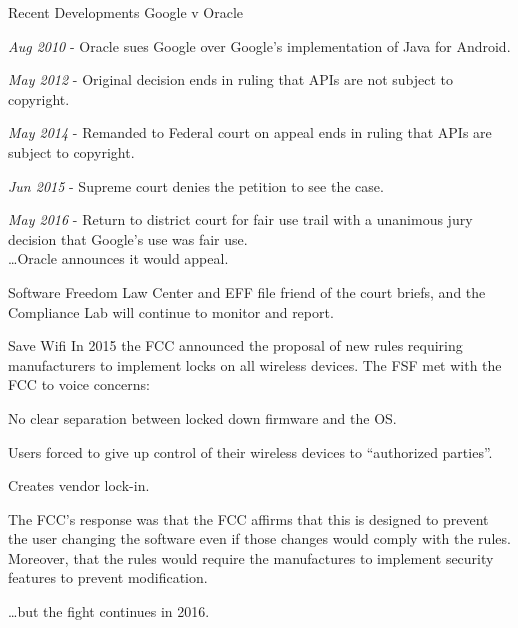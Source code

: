 \documentclass[
  size=12pt,
  style=simple,
  paper=screen
]{powerdot}
\begin{document}
\begin{wideslide}{Recent Developments}
  Google v Oracle

  \pp

  \begin{itemize}
    \setlength{\itemsep}{0.5em}

    \sitem \emph{Aug 2010} - Oracle sues Google over Google's
    implementation of Java for Android.

    \pp

    \sitem \emph{May 2012} - Original decision ends in ruling that
    APIs are not subject to copyright.

    \pp

    \sitem \emph{May 2014} - Remanded to Federal court on appeal ends
    in ruling that APIs are subject to copyright.

    \pp

    \sitem \emph{Jun 2015} - Supreme court denies the petition to see
    the case.

    \pp

    \sitem \emph{May 2016} - Return to district court for fair use
    trail with a unanimous jury decision that Google's use was fair
    use. \pp \\ \ldots Oracle announces it would appeal.

    \pp

  \end{itemize}

  Software Freedom Law Center and EFF file friend of the court briefs,
  and the Compliance Lab will continue to monitor and report.
\end{wideslide}

\begin{wideslide}{Save Wifi}
  In 2015 the FCC announced the proposal of new rules requiring
  manufacturers to implement locks on all wireless devices. The FSF
  met with the FCC to voice concerns:

  \pp

  \begin{itemize}
    \nitem No clear separation between locked down firmware and the
    OS.

    \pp

    \nitem Users forced to give up control of their wireless devices
    to ``authorized parties''.

    \pp

    \nitem Creates vendor lock-in.

    \pp

  \end{itemize}

  The FCC's response was that the FCC affirms that this is designed to
  prevent the user changing the software even if those changes would
  comply with the rules. Moreover, that the rules would require the
  manufactures to implement security features to prevent modification.
  \pp

  \ldots but the fight continues in 2016.

\end{wideslide}
\end{document}
